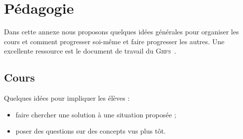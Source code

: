 \chapter{Pédagogie}

Dans cette annexe nous proposons quelques idées générales pour organiser les cours et comment progresser soi-même et faire progresser les autres.
Une excellente ressource est le document de travail du \textsc{Ghfs}~\cite{linnard:how_we_train}.


\section{Cours}


Quelques idées pour impliquer les élèves :
\begin{itemize}
	\item faire chercher une solution à une situation proposée ;
	\item poser des questions sur des concepts vus plus tôt.
\end{itemize}

